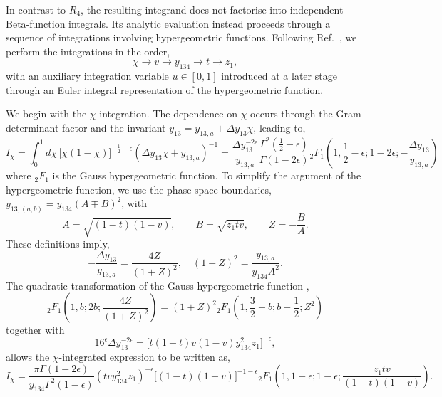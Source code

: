 In contrast to $R_4$, the resulting integrand does not factorise into independent Beta-function
integrals. Its analytic evaluation instead proceeds through a sequence of integrations involving
hypergeometric functions. Following Ref.~\cite{GehrmannDeRidder0311276}, we perform the
integrations in the order,
\begin{equation*}
    \chi\to v\to y_{134}\to t\to z_1,
\end{equation*}
with an auxiliary integration variable $u\in[0,1]$ introduced at a later stage through an Euler
integral representation of the hypergeometric function.

We begin with the $\chi$ integration. The dependence on $\chi$ occurs through the
Gram-determinant factor and the invariant $y_{13}=y_{13,a}+\Delta y_{13}\chi$, leading to,
\begin{equation}
    I_\chi=\int_0^1 d\chi\,\Big[\chi(1-\chi)\Big]^{-\frac12-\epsilon}(\Delta y_{13}\chi+y_{13,a})^{-1}=\frac{\Delta y_{13}^{-2\epsilon}}{y_{13,a}}\frac{\Gamma^2\!\left(\frac12-\epsilon\right)}{\Gamma(1-2\epsilon)}{}_2F_1\!\left(1, \frac12-\epsilon; 1-2\epsilon; -\frac{\Delta y_{13}}{y_{13,a}}\right)
\end{equation}
where ${}_2F_1$ is the Gauss hypergeometric function. To simplify the argument of the
hypergeometric function, we use the phase-space boundaries,
$y_{13,(a,b)}=y_{134}(A\mp B)^2$, with
\begin{equation*}
    A=\sqrt{(1-t)(1-v)},\qquad B=\sqrt{z_1tv},\qquad Z=-\frac BA.
\end{equation*}
These definitions imply,
\begin{equation}
    -\frac{\Delta y_{13}}{y_{13,a}} = \frac{4Z}{(1+Z)^2},\quad (1+Z)^2 = \frac{y_{13,a}}{y_{134}A^2}.
\end{equation}
The quadratic transformation of the Gauss hypergeometric function \cite{Erdelyi:1953HTF},
\begin{equation}
    {}_2F_1\!\left(1,b;2b;\frac{4Z}{(1+Z)^2}\right) = (1+Z)^2{}_2F_1\!\left(1,\frac32-b;b+\frac12;Z^2\right)
\end{equation}
together with
\begin{equation}
    16^\epsilon\Delta y_{13}^{-2\epsilon}=\Big[t(1-t)v(1-v)y_{134}^2z_1\Big]^{-\epsilon},
\end{equation}
allows the $\chi$-integrated expression to be written as,
\begin{equation}
    I_\chi = \frac{\pi\Gamma(1-2\epsilon)}{y_{134}\Gamma^2(1-\epsilon)}\!\left(tvy_{134}^2z_1\right)^{-\epsilon}\Big[(1-t)(1-v)\Big]^{-1-\epsilon}{}_2F_1\!\left(1,1+\epsilon;1-\epsilon;\frac{z_1tv}{(1-t)(1-v)}\right).
\end{equation}

